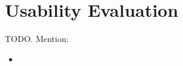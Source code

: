 \section{Usability Evaluation} %
\label{sec:usability_evaluation}
TODO. Mention:
\begin{itemize}
	\item 
\end{itemize}
